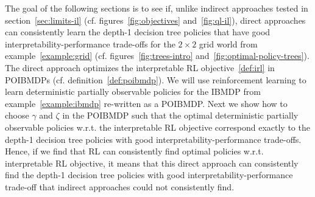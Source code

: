 The goal of the following sections is to see if, unlike indirect approaches tested in section~\ref{sec:limits-il} (cf. figures~\ref{fig:objectives} and~\ref{fig:ql-il}), direct approaches can consistently learn the depth-1 decision tree policies that have good interpretability-performance trade-offs for the $2\times 2$ grid world from example~\ref{example:grid} (cf. figures~\ref{fig:trees-intro} and~\ref{fig:optimal-policy-trees}).
The direct approach optimizes the interpretable RL objective~\ref{def:irl} in POIBMDPs (cf. definition~\ref{def:poibmdp}).
We will use reinforcement learning to learn deterministic partially observable policies for the IBMDP from example~\ref{example:ibmdp} re-written as a POIBMDP.
Next we show how to choose $\gamma$ and $\zeta$ in the POIBMDP such that the optimal deterministic partially observable policies w.r.t. the interpretable RL objective correspond exactly to the depth-1 decision tree policies with good interpretability-performance trade-offs.
Hence, if we find that RL can consistently find optimal policies w.r.t. interpretable RL objective, it means that this direct approach can consistently find the depth-1 decision tree policies with good interpretability-performance trade-off that indirect approaches could not consistently find.

